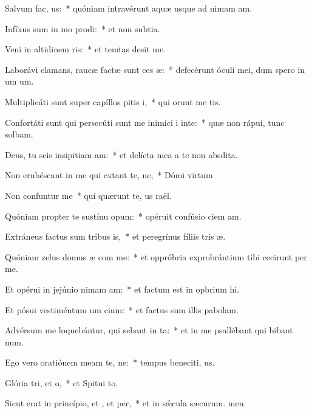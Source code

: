 \item Salvum  fac, us:~* quóniam intravérunt aquæ usque ad nimam am.
\item Infíxus sum in mo prodi:~* et non  subtia.
\item Veni in altidinem ris:~* et temtas desit me.
\item Laborávi clamans, raucæ factæ sunt ces æ:~* defecérunt óculi mei, dum spero in um um.
\item Multiplicáti sunt super capíllos pitis i,~* qui orunt me tis.
\item Confortáti sunt qui persecúti sunt me inimíci i inte:~* quæ non rápui, tunc solbam.
\item Deus, tu scis insipitiam am:~* et delícta mea a te non  absdita.
\item Non erubéscant in me qui extant te, ne,~* Dómi virtum
\item Non confuntur  me~* qui quærunt te, us raël.
\item Quóniam propter te sustínu opum:~* opéruit confúsio ciem am.
\item Extráneus factus sum tribus is,~* et peregrínus fíliis tris æ.
\item Quóniam zelus domus æ com me:~* et oppróbria exprobrántium tibi cecirunt per me.
\item Et opérui in jejúnio nimam am:~* et factum est in opbrium hi.
\item Et pósui vestiméntum um cium:~* et factus sum illis  pabolam.
\item Advérsum me loquebántur, qui sebant in ta:~* et in me psallébant qui bibant num.
\item Ego vero oratiónem meam  te, ne:~* tempus beneciti, us.
\item Glória tri, et o,~* et Spitui to.
\item Sicut erat in princípio, et , et per,~* et in sǽcula sæcurum. men.
